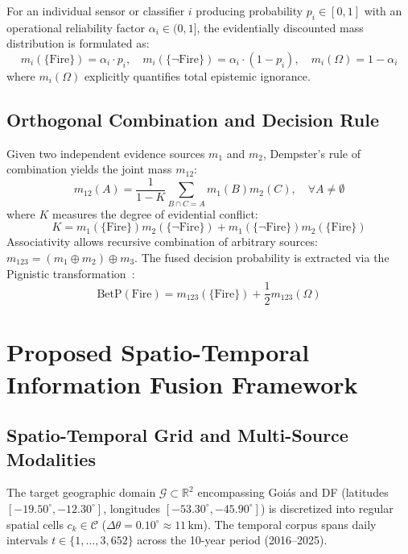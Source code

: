 \documentclass[runningheads]{llncs}
\begin{document}
For an individual sensor or classifier $i$ producing probability $p_i \in [0, 1]$ with an operational reliability factor $\alpha_i \in (0, 1]$, the evidentially discounted mass distribution is formulated as:
\begin{equation}
    m_i(\{\text{Fire}\}) = \alpha_i \cdot p_i, \quad m_i(\{\neg\text{Fire}\}) = \alpha_i \cdot (1 - p_i), \quad m_i(\Omega) = 1 - \alpha_i
\end{equation}
where $m_i(\Omega)$ explicitly quantifies total epistemic ignorance.

\subsection{Orthogonal Combination and Decision Rule}
Given two independent evidence sources $m_1$ and $m_2$, Dempster's rule of combination yields the joint mass $m_{12}$:
\begin{equation}
    m_{12}(A) = \frac{1}{1 - K} \sum_{B \cap C = A} m_1(B) m_2(C), \quad \forall A \neq \emptyset
\end{equation}
where $K$ measures the degree of evidential conflict:
\begin{equation}
    K = m_1(\{\text{Fire}\}) m_2(\{\neg\text{Fire}\}) + m_1(\{\neg\text{Fire}\}) m_2(\{\text{Fire}\})
\end{equation}
Associativity allows recursive combination of arbitrary sources: $m_{123} = (m_1 \oplus m_2) \oplus m_3$. The fused decision probability is extracted via the Pignistic transformation~\cite{smets1994transferable}:
\begin{equation}
    \text{BetP}(\text{Fire}) = m_{123}(\{\text{Fire}\}) + \frac{1}{2} m_{123}(\Omega)
\end{equation}

\section{Proposed Spatio-Temporal Information Fusion Framework}
\label{sec:framework}

\subsection{Spatio-Temporal Grid and Multi-Source Modalities}
The target geographic domain $\mathcal{G} \subset \mathbb{R}^2$ encompassing Goi\'as and DF (latitudes $[-19.50^\circ, -12.30^\circ]$, longitudes $[-53.30^\circ, -45.90^\circ]$) is discretized into regular spatial cells $c_k \in \mathcal{C}$ ($\Delta \theta = 0.10^\circ \approx 11\,\text{km}$). The temporal corpus spans daily intervals $t \in \{1, \dots, 3{,}652\}$ across the 10-year period (2016--2025).
\end{document}
